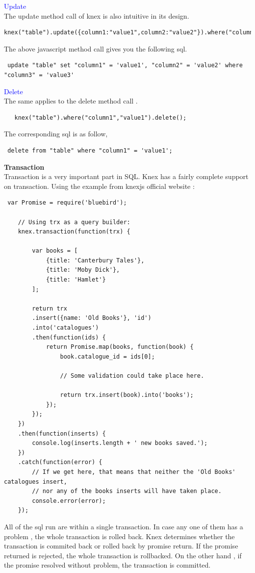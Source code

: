 \documentclass[a4paper]{article}
\begin{document}
\textcolor{blue}{Update}\\
The update method call of knex is also intuitive in its design.
\begin{lstlisting}
knex("table").update({column1:"value1",column2:"value2"}).where("column3","value3")
\end{lstlisting}
The above javascript method call gives you the following sql.
\begin{lstlisting}
 update "table" set "column1" = 'value1', "column2" = 'value2' where "column3" = 'value3'
\end{lstlisting}
\textcolor{blue}{Delete}\\
The same applies to the delete method call .
\begin{lstlisting}
   knex("table").where("column1","value1").delete();
\end{lstlisting}
The corresponding sql is as follow,
\begin{lstlisting}
 delete from "table" where "column1" = 'value1';
\end{lstlisting}
\textbf{Transaction}\\
Transaction is a very important part in SQL. Knex has a fairly complete support on transaction. Using the example from knexjs official website :
\begin{lstlisting}
 var Promise = require('bluebird');

    // Using trx as a query builder:
    knex.transaction(function(trx) {

        var books = [
            {title: 'Canterbury Tales'},
            {title: 'Moby Dick'},
            {title: 'Hamlet'}
        ];

        return trx
        .insert({name: 'Old Books'}, 'id')
        .into('catalogues')
        .then(function(ids) {
            return Promise.map(books, function(book) {
                book.catalogue_id = ids[0];

                // Some validation could take place here.

                return trx.insert(book).into('books');
            });
        });
    })
    .then(function(inserts) {
        console.log(inserts.length + ' new books saved.');
    })
    .catch(function(error) {
        // If we get here, that means that neither the 'Old Books' catalogues insert,
        // nor any of the books inserts will have taken place.
        console.error(error);
    });
\end{lstlisting}
All of the sql run are within a single transaction. In case any one of them has a problem , the whole transaction is rolled back. Knex determines whether the transaction is commited back or rolled back by promise return. If the promise returned is rejected, the whole transaction is rollbacked. On the other hand , if the promise resolved without problem, the transaction is committed.\\
\end{document}
